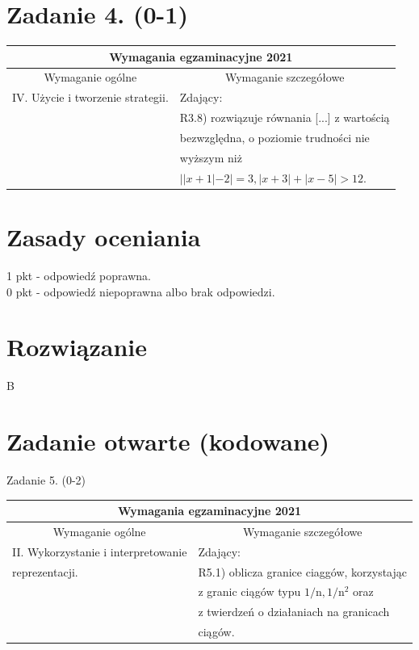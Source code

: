 \documentclass[10pt]{article}
\begin{document}
\section*{Zadanie 4. (0-1)}
\begin{center}
\begin{tabular}{|l|l|}
\hline
\multicolumn{2}{|c|}{Wymagania egzaminacyjne 2021} \\
\hline
\multicolumn{1}{|c|}{Wymaganie ogólne} & \multicolumn{1}{c|}{Wymaganie szczegółowe} \\
\hline
IV. Użycie i tworzenie strategii. & Zdający: \\
 & R3.8) rozwiązuje równania [...] z wartością \\
 & bezwzględna, o poziomie trudności nie \\
 & wyższym niż \\
 & $||x+1|-2|=3,|x+3|+|x-5|>12$. \\
\hline
\end{tabular}
\end{center}

\section*{Zasady oceniania}
1 pkt - odpowiedź poprawna.\\
0 pkt - odpowiedź niepoprawna albo brak odpowiedzi.

\section*{Rozwiązanie}
B

\section*{Zadanie otwarte (kodowane)}
Zadanie 5. (0-2)

\begin{center}
\begin{tabular}{|l|l|}
\hline
\multicolumn{2}{|c|}{Wymagania egzaminacyjne 2021} \\
\hline
\multicolumn{1}{|c|}{Wymaganie ogólne} & \multicolumn{1}{c|}{Wymaganie szczegółowe} \\
\hline
II. Wykorzystanie i interpretowanie & Zdający: \\
reprezentacji. & R5.1) oblicza granice ciaggów, korzystając \\
 & z granic ciągów typu $1 / \mathrm{n}, 1 / \mathrm{n}^{2}$ oraz \\
 & z twierdzeń o działaniach na granicach \\
 & ciągów. \\
\hline
\end{tabular}
\end{center}
\end{document}
